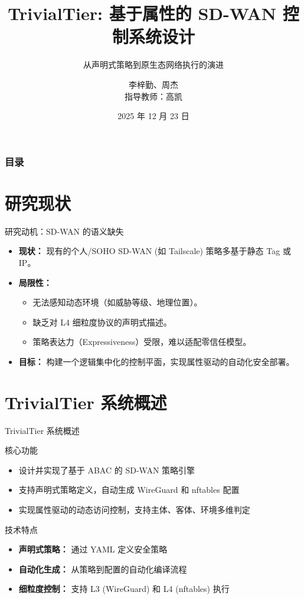 \documentclass[aspectratio=169, 10pt]{beamer}
\title[TrivialTier: ABAC SD-WAN]{TrivialTier: 基于属性的 SD-WAN 控制系统设计}
\subtitle{从声明式策略到原生态网络执行的演进}
\author[李梓勤, 周杰]{李梓勤、周杰 \\ 指导教师：高凯}
\institute[SCU]{四川大学网络空间安全学院}
\date{2025 年 12 月 23 日}
\begin{document}
\begin{frame}
\titlepage
\end{frame}

\begin{frame}
\frametitle{目录}
\tableofcontents
\end{frame}

\section{研究现状}
\begin{frame}{研究动机：SD-WAN 的语义缺失}
\begin{itemize}
    \item \textbf{现状：} 现有的个人/SOHO SD-WAN (如 Tailscale) 策略多基于静态 Tag 或 IP。
    \item \textbf{局限性：}
    \begin{itemize}
        \item 无法感知动态环境（如威胁等级、地理位置）。
        \item 缺乏对 L4 细粒度协议的声明式描述。
        \item 策略表达力（Expressiveness）受限，难以适配零信任模型。
    \end{itemize}
    \item \textbf{目标：} 构建一个逻辑集中化的控制平面，实现属性驱动的自动化安全部署。
\end{itemize}
\end{frame}

\section{TrivialTier 系统概述}
\begin{frame}{TrivialTier 系统概述}
\begin{block}{核心功能}
\begin{itemize}
    \item 设计并实现了基于 ABAC 的 SD-WAN 策略引擎
    \item 支持声明式策略定义，自动生成 WireGuard 和 nftables 配置
    \item 实现属性驱动的动态访问控制，支持主体、客体、环境多维判定
\end{itemize}
\end{block}
\begin{block}{技术特点}
\begin{itemize}
    \item \textbf{声明式策略：} 通过 YAML 定义安全策略
    \item \textbf{自动化生成：} 从策略到配置的自动化编译流程
    \item \textbf{细粒度控制：} 支持 L3 (WireGuard) 和 L4 (nftables) 执行
\end{itemize}
\end{block}
\end{frame}
\end{document}
